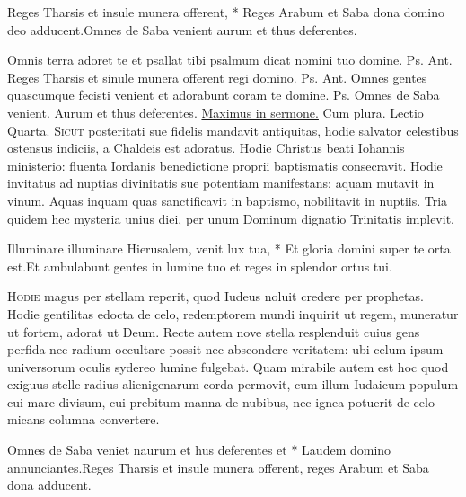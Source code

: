 \begin{multicols*}{2}
\begin{responsory-doxology}
{Reges Tharsis et insule munera offerent, * Reges Arabum et Saba dona domino deo adducent.}{Omnes de Saba venient aurum et thus deferentes.}
\end{responsory-doxology}
 Omnis terra adoret te et psallat tibi psalmum dicat nomini tuo domine. {\color{Red} Ps.}  {\color{Red} Ant.} Reges Tharsis et sinule munera offerent regi domino. {\color{Red} Ps.}  {\color{Red} Ant.} Omnes gentes quascumque fecisti venient et adorabunt coram te domine. {\color{Red} Ps.}  \V Omnes de Saba venient. \R Aurum et thus deferentes.
\newline \ul{Maximus in sermone.} Cum plura. {\color{Red} Lectio Quarta.} 
\lettrine[lines=2]{\zallmancaps \color{Blue} S}{icut} posteritati sue fidelis mandavit antiquitas, hodie salvator celestibus ostensus indiciis, a Chaldeis est adoratus. Hodie Christus beati Iohannis ministerio: fluenta Iordanis benedictione proprii baptismatis consecravit. Hodie invitatus ad nuptias divinitatis sue potentiam manifestans: aquam mutavit in vinum. Aquas inquam quas sanctificavit in baptismo, nobilitavit in nuptiis. Tria quidem hec mysteria unius diei, per unum Dominum dignatio Trinitatis implevit.
\begin{responsory}
{Illuminare illuminare Hierusalem, venit lux tua, * Et gloria domini super te orta est.}{Et ambulabunt gentes in lumine tuo et reges in splendor ortus tui.}
\end{responsory}
\lettrine[lines=2]{\zallmancaps \color{Red} H}{odie} magus per stellam reperit, quod Iudeus noluit credere per prophetas. Hodie gentilitas edocta de celo,
redemptorem mundi inquirit ut regem, muneratur ut fortem, adorat ut Deum. Recte autem nove stella resplenduit cuius gens perfida nec radium occultare possit nec abscondere veritatem: ubi celum ipsum universorum oculis sydereo lumine fulgebat. Quam mirabile autem est hoc quod exiguus stelle radius alienigenarum corda permovit, cum illum Iudaicum populum cui mare divisum, cui prebitum manna de nubibus, nec ignea potuerit de celo micans columna convertere.
\begin{responsory}
{Omnes de Saba veniet naurum et hus deferentes et * Laudem domino annunciantes.}{Reges Tharsis et insule munera offerent, reges Arabum et Saba dona adducent.}

\end{responsory}
\end{multicols*}
